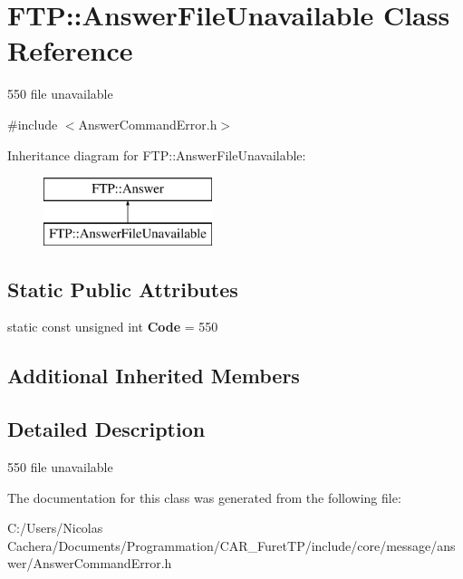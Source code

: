 \hypertarget{classFTP_1_1AnswerFileUnavailable}{}\section{F\+T\+P\+:\+:Answer\+File\+Unavailable Class Reference}
\label{classFTP_1_1AnswerFileUnavailable}


550 file unavailable  




{\ttfamily \#include $<$Answer\+Command\+Error.\+h$>$}

Inheritance diagram for F\+T\+P\+:\+:Answer\+File\+Unavailable\+:\begin{figure}[H]
\begin{center}
\leavevmode
\includegraphics[height=2.000000cm]{classFTP_1_1AnswerFileUnavailable}
\end{center}
\end{figure}
\subsection*{Static Public Attributes}
\begin{DoxyCompactItemize}
\item 
\hypertarget{classFTP_1_1AnswerFileUnavailable_adf574d290aa6e1609cce557f7d54515f}{}static const unsigned int {\bfseries Code} = 550\label{classFTP_1_1AnswerFileUnavailable_adf574d290aa6e1609cce557f7d54515f}

\end{DoxyCompactItemize}
\subsection*{Additional Inherited Members}


\subsection{Detailed Description}
550 file unavailable 

The documentation for this class was generated from the following file\+:\begin{DoxyCompactItemize}
\item 
C\+:/\+Users/\+Nicolas Cachera/\+Documents/\+Programmation/\+C\+A\+R\+\_\+\+Furet\+T\+P/include/core/message/answer/Answer\+Command\+Error.\+h\end{DoxyCompactItemize}
